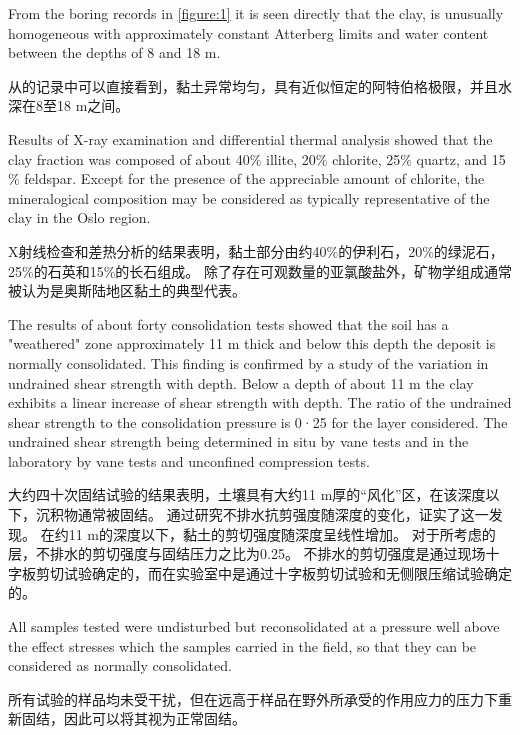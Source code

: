 \begin{paracol}{2}

    \noindent From the boring records in \autoref{figure:1} it is seen directly that the clay, is unusually homogeneous with approximately constant Atterberg limits and water content between the depths of 8 and 18 m. 

    \switchcolumn

    \noindent 从的记录中可以直接看到，黏土异常均匀，具有近似恒定的阿特伯格极限，并且水深在8至18 m之间。

    \switchcolumn*

    Results of X-ray examination and differential thermal analysis showed that the clay fraction was composed of about 40$\%$ illite, 20$\%$ chlorite, 25$\%$ quartz, and 15$\%$ feldspar. Except for the presence of the appreciable amount of chlorite, the mineralogical composition may be considered as typically representative of the clay in the Oslo region.

    \switchcolumn

    X射线检查和差热分析的结果表明，黏土部分由约40$\%$的伊利石，20$\%$的绿泥石，25$\%$的石英和15$\%$的长石组成。 除了存在可观数量的亚氯酸盐外，矿物​​学组成通常被认为是奥斯陆地区黏土的典型代表。

    \switchcolumn*

    The results of about forty consolidation tests showed that the soil has a "weathered" zone approximately 11 m thick and below this depth the deposit is normally consolidated. This finding is confirmed by a study of the variation in undrained shear strength with depth. Below a depth of about 11 m the clay exhibits a linear increase of shear strength with depth. The ratio of the undrained shear strength to the consolidation pressure is 0·25 for the layer considered. The undrained shear strength being determined in situ by vane tests and in the laboratory by vane tests and unconfined compression tests.

    \switchcolumn
        
    大约四十次固结试验的结果表明，土壤具有大约11 m厚的“风化”区，在该深度以下，沉积物通常被固结。 通过研究不排水抗剪强度随深度的变化，证实了这一发现。 在约11 m的深度以下，黏土的剪切强度随深度呈线性增加。 对于所考虑的层，不排水的剪切强度与固结压力之比为0.25。 不排水的剪切强度是通过现场十字板剪切试验确定的，而在实验室中是通过十字板剪切试验和无侧限压缩试验确定的。

    \switchcolumn*

    All samples tested were undisturbed but reconsolidated at a pressure well above the effect stresses which the samples carried in the field, so that they can be considered as normally consolidated.

    \switchcolumn
        
    所有试验的样品均未受干扰，但在远高于样品在野外所承受的作用应力的压力下重新固结，因此可以将其视为正常固结。
    
\end{paracol}